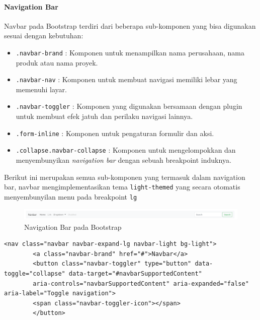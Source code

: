 \documentclass[a4paper,twoside]{article}
\begin{document}
\begin{enumerate}
		\paragraph{Navigation Bar} \par
		Navbar pada Bootstrap terdiri dari beberapa sub-komponen yang bisa digunakan sesuai dengan kebutuhan:
		\begin{itemize}
			\item \texttt{.navbar-brand} : Komponen untuk menampilkan nama perusahaan, nama produk atau nama proyek.
			\item \texttt{.navbar-nav} : Komponen untuk membuat navigasi memiliki lebar yang memenuhi layar.
			\item \texttt{.navbar-toggler} : Komponen yang digunakan bersamaan dengan plugin untuk membuat efek jatuh dan perilaku navigasi lainnya.
			\item \texttt{.form-inline} : Komponen untuk pengaturan formulir dan aksi.
			\item \texttt{.collapse.navbar-collapse} : Komponen untuk mengelompokkan dan menyembunyikan \textit{navigation bar} dengan sebuah breakpoint induknya.
		\end{itemize}
		Berikut ini merupakan semua sub-komponen yang termasuk dalam navigation bar, navbar mengimplementasikan tema \texttt{light-themed} yang secara otomatis menyembunyilan menu pada breakpoint \texttt{lg}
		\begin{figure} [H]
			\centering  
			\includegraphics[scale=1.0]{navbar_bootstrap.PNG}  
			\caption{Navigation Bar pada Bootstrap} 
		\end{figure}
		
		\begin{lstlisting}[frame=single, basicstyle=\tiny] 
		<nav class="navbar navbar-expand-lg navbar-light bg-light">
		<a class="navbar-brand" href="#">Navbar</a>
		<button class="navbar-toggler" type="button" data-toggle="collapse" data-target="#navbarSupportedContent" 
		aria-controls="navbarSupportedContent" aria-expanded="false" aria-label="Toggle navigation">
		<span class="navbar-toggler-icon"></span>
		</button>
		

\end{lstlisting}
\end{enumerate}
\end{document}
